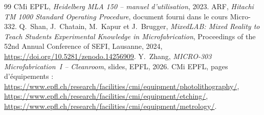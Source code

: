 \begin{thebibliography}{99}
   CMi EPFL, \emph{Heidelberg MLA 150 -- manuel d'utilisation}, 2023.
   ARF, \emph{Hitachi TM 1000 Standard Operating Procedure}, document fourni dans le cours Micro-332.
   Q.~Shan, J.~Chatain, M.~Kapur et J.~Brugger, \emph{MixedLAB: Mixed Reality to Teach Students Experimental Knowledge in Microfabrication}, Proceedings of the 52nd Annual Conference of SEFI, Lausanne, 2024, \url{https://doi.org/10.5281/zenodo.14256909}.
   Y.~Zhang, \emph{MICRO-303 Microfabrication~I -- Cleanroom}, slides, EPFL, 2026.
   CMi EPFL, pages d'équipements :
    \url{https://www.epfl.ch/research/facilities/cmi/equipment/photolithography/},
    \url{https://www.epfl.ch/research/facilities/cmi/equipment/etching/},
    \url{https://www.epfl.ch/research/facilities/cmi/equipment/metrology/}.
\end{thebibliography}
